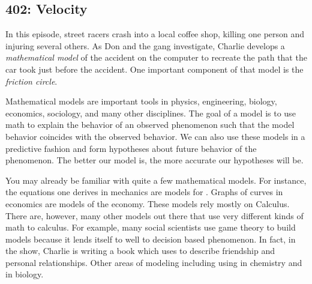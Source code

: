 \newpage
\subsection{402: Velocity}\label{402}

In this episode, street racers crash into a local coffee shop, killing one person and injuring several others. As Don and the gang investigate, Charlie develops a \emph{mathematical model} of the accident on the computer to recreate the path that the car took just before the accident. One important component of that model is the \emph{friction circle}. \\


Mathematical models are important tools in physics, engineering, biology, economics, sociology, and many other disciplines. The goal of a model is to use math to explain the behavior of an observed phenomenon such that the model behavior coincides with the observed behavior. We can also use these models in a predictive fashion and form hypotheses about future behavior of the phenomenon. The better our model is, the more accurate our hypotheses will be. \\

 \vspace{0.2cm}

You may already be familiar with quite a few mathematical models. For instance, the equations one derives in mechanics are models for . Graphs of  curves in economics are models of the economy. These models rely mostly on Calculus. There are, however, many other models out there that use very different kinds of math to calculus. For example, many social scientists use game theory to build models because it lends itself to well to decision based phenomenon. In fact, in the show, Charlie is writing a book which uses  to describe friendship and personal relationships. Other areas of modeling including using  in chemistry and  in biology. \\

